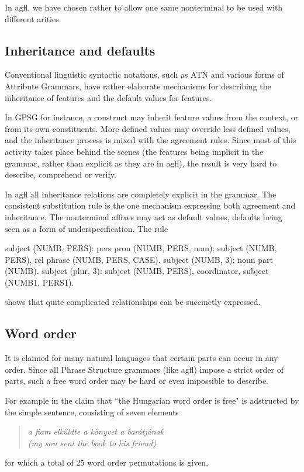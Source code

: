 In {\sc agfl}, we have chosen rather to allow one same nonterminal
to be used with different arities.
\subsection{Inheritance and defaults}
Conventional linguistic syntactic notations, such as ATN and various
forms of Attribute Grammars, have rather elaborate mechanisms for describing
the inheritance of features and the default values for features.

In GPSG \cite{gazdar:gpsg} for instance, a construct
may inherit feature values from the context, or from its own constituents.
More defined values may override less defined values, and the inheritance
process is mixed with the agreement rules. Since most of this activity
takes place behind the scenes (the features being implicit in the grammar,
rather than explicit as they are in {\sc agfl}), the result is very hard to describe,
comprehend or verify. 

In {\sc agfl} all inheritance relations are completely explicit in the grammar.
The consistent substitution rule is the one mechanism expressing both
agreement and inheritance. The
nonterminal affixes may act as default values, defaults being seen as a
form of underspecification. The rule
\begin{elan}
subject (NUMB, PERS):
  pers pron (NUMB, PERS, nom);
  subject (NUMB, PERS), rel phrase (NUMB, PERS, CASE).
subject (NUMB, 3):
  noun part (NUMB).
subject (plur, 3):
  subject (NUMB, PERS), coordinator, subject (NUMB1, PERS1).
\end{elan}
\noindent
shows that quite complicated relationships can be succinctly expressed.
\subsection{Word order}
It is claimed for many natural languages that certain parts can
occur in any order. Since all Phrase Structure grammars (like {\sc agfl})
impose a strict order of parts, such a free word order may be hard or
even impossible to describe.

For example in \cite{l28} the claim that ``the Hungarian
word order is free" is adstructed by the simple sentence, consisting of seven
elements
\begin{quote}
{\sl a fiam elk\"uldte a k\"onyvet a bar\'atj\'anak}\\
{\sl (my son sent the book to his friend)}
\end{quote}
\noindent
for which a total of 25 word order permutations is given.

